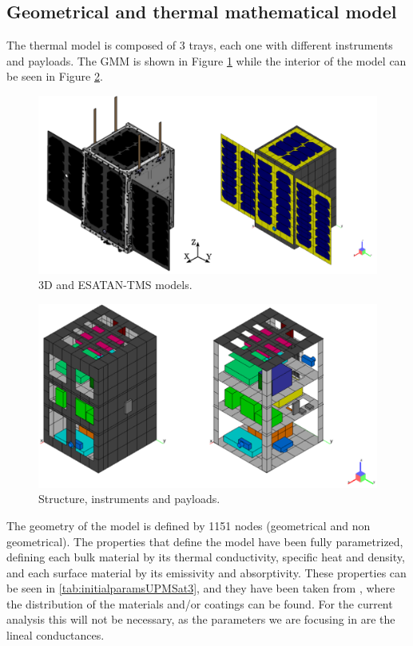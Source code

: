 \subsection{Geometrical and thermal mathematical model}
The thermal model is composed of 3 trays, each one with different instruments and payloads.  The GMM is shown in Figure \ref{fig:UPMSat3-GMM} while the interior of the model can be seen in  Figure \ref{fig:UPMSat3-Str-Inst-PL}.
\begin{figure}[H]
    \centering
    \includegraphics[width = \textwidth]{Figures/UPMSat3/3DandESATAN-TNSmodel.png}
    \caption{3D and ESATAN-TMS models.}
    \label{fig:UPMSat3-GMM}
\end{figure}
\begin{figure}[H]
    \centering
    \includegraphics[width = \textwidth]{Figures/UPMSat3/str-inst-PL ESATANmodels.png}
    \caption{Structure, instruments and payloads.}
    \label{fig:UPMSat3-Str-Inst-PL}
\end{figure}

The geometry of the model is defined by 1151 nodes (geometrical and non geometrical). The properties that define the model have been fully parametrized, defining each bulk material by its thermal conductivity, specific heat and density, and each surface material by its emissivity and absorptivity. These properties can be seen in \autoref{tab:initialparamsUPMSat3}, and they have been taken from \cite{Sergio}, where the distribution of the materials and/or coatings can be found. For the current analysis this will not be necessary, as the parameters we are focusing in are the lineal conductances. 

